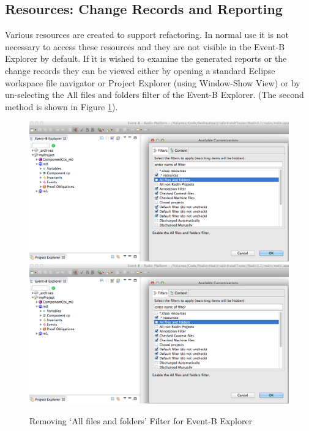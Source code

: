 \subsection{Resources: Change Records and Reporting}

Various resources are created to support refactoring. In normal use it is not necessary to access these resources and they are not visible in the Event-B Explorer by default. If it is wished to examine the generated reports or the change records they can be viewed either by opening a standard Eclipse workspace file navigator or Project Explorer (using Window-Show View) or by un-selecting the All files and folders filter of the Event-B Explorer. (The second method is shown in Figure \ref{fig:RemovingAllFilesAndFoldersFilterForEventBExplorer}).

 \begin{figure}[!htbp]
  \centering
  \ifplastex
  \includegraphics[width=1024]{figures/image65.png}
  \else
  \includegraphics[width=1\textwidth]{figures/image65.png}
  \fi
  \caption{Removing `All files and folders' Filter for Event-B Explorer}
  \label{fig:RemovingAllFilesAndFoldersFilterForEventBExplorer}
\end{figure} 

